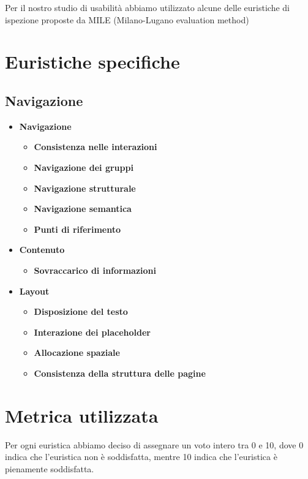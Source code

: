     Per il nostro studio di usabilità abbiamo utilizzato alcune delle euristiche
    di ispezione proposte da MILE (Milano-Lugano evaluation method)
    \section{Euristiche specifiche}
        \subsection{Navigazione}
        \begin{itemize}
            \item \textbf{Navigazione}
            \begin{itemize}
                \item \textbf{Consistenza nelle interazioni}
                \item \textbf{Navigazione dei gruppi}
                \item \textbf{Navigazione strutturale}
                \item \textbf{Navigazione semantica}
                \item \textbf{Punti di riferimento}
            \end{itemize}
            \item \textbf{Contenuto}
            \begin{itemize}
                \item \textbf{Sovraccarico di informazioni}
            \end{itemize}
            \item \textbf{Layout}
            \begin{itemize}
                \item \textbf{Disposizione del testo}
                \item \textbf{Interazione dei placeholder}
                \item \textbf{Allocazione spaziale}
                \item \textbf{Consistenza della struttura delle pagine}
            \end{itemize}
        \end{itemize}
    \section{Metrica utilizzata} 
    Per ogni euristica abbiamo deciso di assegnare un voto intero tra 0 e 10,
    dove 0 indica che l'euristica non è soddisfatta, mentre 10 indica che
    l'euristica è pienamente soddisfatta.